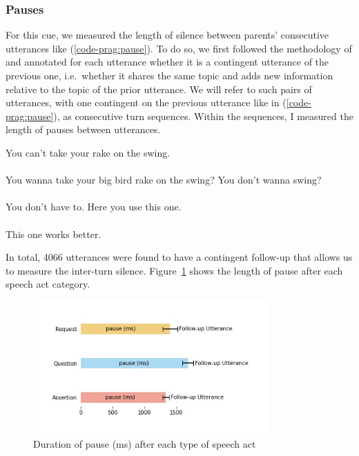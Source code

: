 \subsubsection{Pauses}
\label{sec:engsp:results:pause}

For this cue, we measured the length of silence between parents’ consecutive utterances like (\ref{code-prag:pause}). To do so, we first followed the methodology of \textcite{bloom1976discourse} and annotated for each utterance whether it is a contingent utterance of the previous one, i.e.\ whether it shares the same topic and adds new information relative to the topic of the prior utterance. We will refer to such pairs of utterances, with one contingent on the previous utterance like in (\ref{code-prag:pause}), as consecutive turn sequences. Within the sequences, I measured the length of pauses between utterances. 


\bxl
You can’t take your rake on the swing.\\
  \\ 
 You wanna take your big bird rake on the swing? 			\hfill {}
\ex You don't wanna swing?\\
  \\	
 You don’t have to.	\hfill {}
\ex Here you use this one. \\
  \\ This one works better.	\hfill {}
\exl
\eex

In total, 4066 utterances were found to have a contingent follow-up that allows us to measure the inter-turn silence. Figure~\ref{fig:engsp:pause} shows the length of pause after each speech act category.

\begin{figure}[H]
\begin{center}
\includegraphics[width = 0.8\textwidth]{figures/pause.jpg}
	\caption{Duration of pause (ms) after each type of speech act}\label{fig:engsp:pause}
\end{center}
\end{figure}


